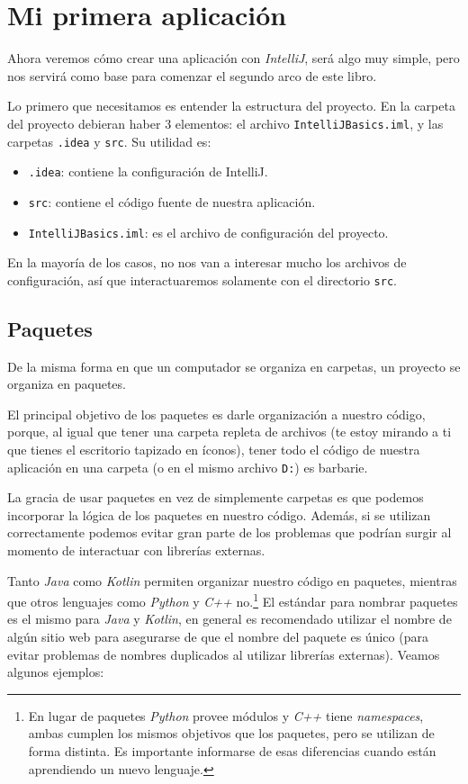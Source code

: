 \section{Mi primera aplicación}
  Ahora veremos cómo crear una aplicación con \textit{IntelliJ}, será algo muy simple, pero nos
  servirá como base para comenzar el segundo arco de este libro.

  Lo primero que necesitamos es entender la estructura del proyecto.
  En la carpeta del proyecto debieran haber 3 elementos: el archivo \texttt{IntelliJBasics.iml}, y 
  las carpetas \texttt{.idea} y \texttt{src}.
  Su utilidad es:
  \begin{itemize}
    \item \texttt{.idea}: contiene la configuración de IntelliJ.
    \item \texttt{src}: contiene el código fuente de nuestra aplicación.
    \item \texttt{IntelliJBasics.iml}: es el archivo de configuración del proyecto.
  \end{itemize}

  En la mayoría de los casos, no nos van a interesar mucho los archivos de configuración, así que
  interactuaremos solamente con el directorio \texttt{src}.

  \subsection{Paquetes}
    De la misma forma en que un computador se organiza en carpetas, un proyecto se organiza en 
    paquetes.

    El principal objetivo de los paquetes es darle organización a nuestro código, porque, al igual 
    que tener una carpeta repleta de archivos (te estoy mirando a ti que tienes el escritorio 
    tapizado en íconos), tener todo el código de nuestra aplicación en una carpeta (o en el mismo 
    archivo \texttt{D:}) es barbarie.

    La gracia de usar paquetes en vez de simplemente carpetas es que podemos incorporar la lógica de
    los paquetes en nuestro código.
    Además, si se utilizan correctamente podemos evitar gran parte de los problemas que podrían
    surgir al momento de interactuar con librerías externas.
    
    Tanto \textit{Java} como \textit{Kotlin} permiten organizar nuestro código en paquetes, mientras
    que otros lenguajes como \textit{Python} y \textit{C++} no.\footnote{En lugar de paquetes 
    \textit{Python} provee módulos y \textit{C++} tiene \textit{namespaces}, ambas cumplen los 
    mismos objetivos que los paquetes, pero se utilizan de forma distinta. 
    Es importante informarse de esas diferencias cuando están aprendiendo un nuevo lenguaje.}
    El estándar para nombrar paquetes es el mismo para \textit{Java} y \textit{Kotlin}, en general
    es recomendado utilizar el nombre de algún sitio web para asegurarse de que el nombre del 
    paquete es único (para evitar problemas de nombres duplicados al utilizar librerías externas).
    Veamos algunos ejemplos:
    

